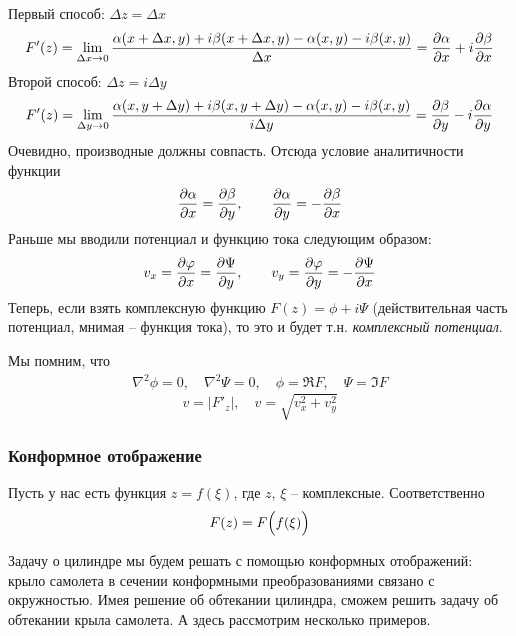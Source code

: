 Первый способ: $\Delta z = \Delta x$
\begin{equation}
	F'(z)=\lim\limits_{\Delta x\to0}\frac{\alpha(x+\Delta x,y)+i\beta(x+\Delta x,y)-\alpha(x,y)-i\beta(x,y)}{\Delta x}=
		\pdv{\alpha}{x}+i\pdv{\beta}{x}
\end{equation}
Второй способ: $\Delta z=i\Delta y$
\begin{equation}
	F'(z)=\lim\limits_{\Delta y\to0}\frac{\alpha(x,y+\Delta y)+i\beta(x,y+\Delta y)-\alpha(x,y)-i\beta(x,y)}{i\Delta y}=
		\pdv{\beta}{y}-i\pdv{\alpha}{y}
\end{equation}
Очевидно, производные должны совпасть. Отсюда условие аналитичности функции
\begin{gather}
	\label{eq2}
	\pdv{\alpha}{x}=\pdv{\beta}{y}, \qquad
	\pdv{\alpha}{y}=-\pdv{\beta}{x}
\end{gather}
Раньше мы вводили потенциал и функцию тока следующим образом:
\begin{gather}
	\label{eq3}
	v_x=\pdv{\varphi}{x}=\pdv{\Psi}{y}, \qquad
	v_y=\pdv{\varphi}{y}=-\pdv{\Psi}{x}
\end{gather}
Теперь, если взять комплексную функцию $F(z)=\phi+i\Psi$ (действительная часть потенциал, мнимая --  функция тока), то это и будет т.н. \textit{комплексный потенциал}.

Мы помним, что
\begin{gather}
	\nabla^2\phi=0,\quad
	\nabla^2\Psi=0,\quad
	\phi=\Re{F},\quad
	\Psi=\Im{F}
\end{gather}
\begin{equation}
	v=|F'_z|, \quad
	v=\sqrt{v_x^2+v_y^2}
\end{equation}

\subsubsection{Конформное отображение}
Пусть у нас есть функция
	$z=f(\xi)$, где $z$, $\xi$ -- комплексные. Соответственно
\begin{equation}
	F(z)=F\qty(\vphantom{\vec{b}}f(\xi))
\end{equation}

Задачу о цилиндре мы будем решать с помощью конформных отображений: крыло самолета в сечении конформными преобразованиями связано с окружностью. Имея решение об обтекании цилиндра, сможем решить задачу об обтекании крыла самолета. А здесь рассмотрим несколько примеров.

